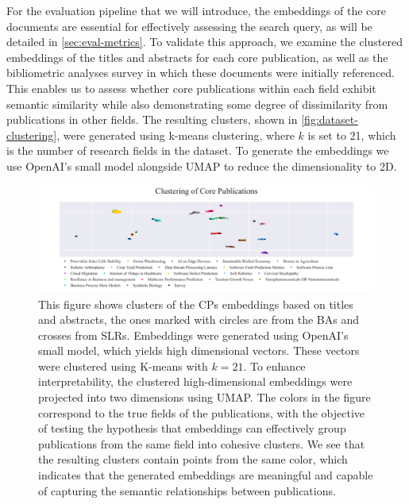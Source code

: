 For the evaluation pipeline that we will introduce, the embeddings of the core documents are essential for effectively assessing the search query, as will be detailed in \autoref{sec:eval-metrics}. To validate this approach, we examine the clustered embeddings of the titles and abstracts for each core publication, as well as the bibliometric analyses survey in which these documents were initially referenced. This enables us to assess whether core publications within each field exhibit semantic similarity while also demonstrating some degree of dissimilarity from publications in other fields. The resulting clusters, shown in \autoref{fig:dataset-clustering}, were generated using k-means clustering, where $k$ is set to 21, which is the number of research fields in the dataset. To generate the embeddings we use OpenAI's small model alongside UMAP \autocite{Healy2024} to reduce the dimensionality to 2D.

\begin{figure}[!t]
	\hspace*{-.8cm}	
	\includegraphics[scale=0.45]{pics/umap_clustering.pdf}
	\caption[Core Publications Clustering]{This figure shows clusters of the CPs embeddings based on titles and abstracts, the ones marked with circles are from the BAs and crosses from SLRs. Embeddings were generated using OpenAI's small model, which yields high dimensional vectors. These vectors were clustered using K-means with $k=21$. To enhance interpretability, the clustered high-dimensional embeddings were projected into two dimensions using UMAP. The colors in the figure correspond to the true fields of the publications, with the objective of testing the hypothesis that embeddings can effectively group publications from the same field into cohesive clusters. We see that the resulting clusters contain points from the same color, which indicates that the generated embeddings are meaningful and capable of capturing the semantic relationships between publications.}
	\label{fig:dataset-clustering}
\end{figure}



